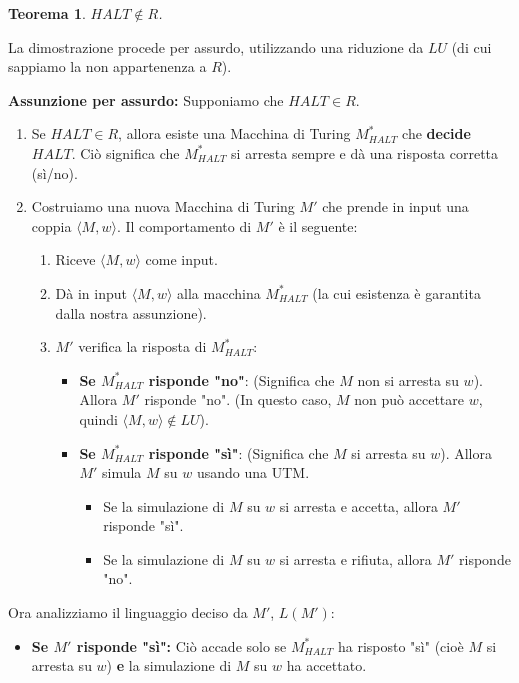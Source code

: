 \documentclass[a4paper]{article}
\makeatletter
\newtheorem{theorem}{Teorema}[section] %
\renewenvironment{proof}[1][\proofname]{\par
  \pushQED{\qed}%
  \normalfont \topsep6\p@\@plus6\p@\relax
  \trivlist
  \item[\hskip\labelsep
        \bfseries
    #1\@addpunct{.}]\ignorespaces
}{%
  \popQED\endtrivlist\@endpefalse
}
\makeatother
\begin{document}
\begin{theorem}
$HALT \notin R$.
\end{theorem}
\begin{proof}
La dimostrazione procede per assurdo, utilizzando una riduzione da $LU$ (di cui sappiamo la non appartenenza a $R$).

\textbf{Assunzione per assurdo:} Supponiamo che $HALT \in R$.
\begin{enumerate}
    \item Se $HALT \in R$, allora esiste una Macchina di Turing $M_{HALT}^*$ che \textbf{decide} $HALT$. Ciò significa che $M_{HALT}^*$ si arresta sempre e dà una risposta corretta (sì/no).
    \item Costruiamo una nuova Macchina di Turing $M'$ che prende in input una coppia $\langle M, w \rangle$. Il comportamento di $M'$ è il seguente:
    \begin{enumerate}
        \item Riceve $\langle M, w \rangle$ come input.
        \item Dà in input $\langle M, w \rangle$ alla macchina $M_{HALT}^*$ (la cui esistenza è garantita dalla nostra assunzione).
        \item $M'$ verifica la risposta di $M_{HALT}^*$:
        \begin{itemize}
            \item \textbf{Se $M_{HALT}^*$ risponde "no"}: (Significa che $M$ non si arresta su $w$). Allora $M'$ risponde "no". (In questo caso, $M$ non può accettare $w$, quindi $\langle M, w \rangle \notin LU$).
            \item \textbf{Se $M_{HALT}^*$ risponde "sì"}: (Significa che $M$ si arresta su $w$). Allora $M'$ simula $M$ su $w$ usando una UTM.
            \begin{itemize}
                \item Se la simulazione di $M$ su $w$ si arresta e accetta, allora $M'$ risponde "sì".
                \item Se la simulazione di $M$ su $w$ si arresta e rifiuta, allora $M'$ risponde "no".
            \end{itemize}
        \end{itemize}
    \end{enumerate}
\end{enumerate}
Ora analizziamo il linguaggio deciso da $M'$, $L(M')$:
\begin{itemize}
    \item \textbf{Se $M'$ risponde "sì":}
    Ciò accade solo se $M_{HALT}^*$ ha risposto "sì" (cioè $M$ si arresta su $w$) \textbf{e} la simulazione di $M$ su $w$ ha accettato.

\end{itemize}
\end{proof}
\end{document}
